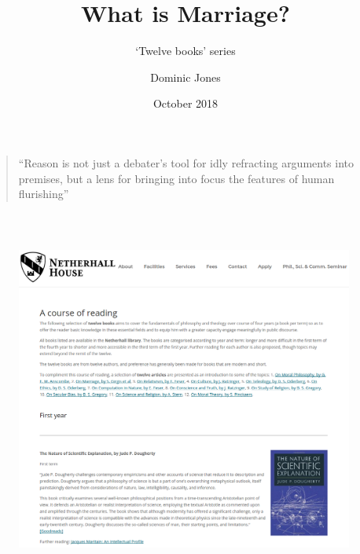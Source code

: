 \documentclass[xcolor=dvipsnames]{beamer}
\title{What is Marriage?}
\subtitle{`Twelve books' series}
\author{Dominic Jones}
\date{\small{October 2018}}
\institute{\small{\texttt{netherhallhouse.org.uk/books}}}
\begin{document}
\begin{frame}[plain]
  \titlepage
\end{frame}


\begin{frame}{}
  \begin{quote}
    ``Reason is not just a debater's tool for idly refracting arguments into premises, but a lens for bringing into focus the features of human flurishing''
  \end{quote}

  ~

  \hspace*{8cm}{What is Marriage?}
\end{frame}


\begin{frame}[plain]
  \begin{columns}[T] %
    \begin{column}{0.9\textwidth}
      \begin{figure}[H]
        \centering
        \includegraphics[width=0.99\textwidth]{reading-group}
      \end{figure}
    \end{column}%
  \end{columns}
\end{frame}
\end{document}
